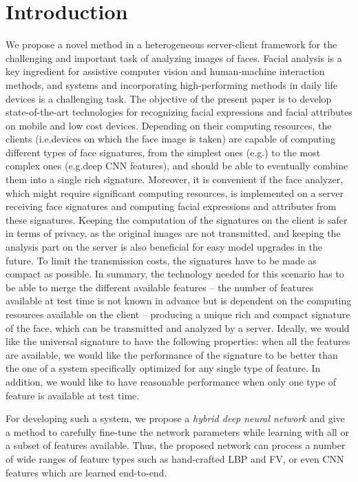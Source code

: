 \documentclass{sig-alternate-05-2015}
\begin{document}
\section{Introduction}\label{sec:intro}
We propose a novel method in a heterogeneous server-client framework for the challenging and important task of analyzing images of faces. Facial analysis is a key ingredient for assistive computer vision and human-machine interaction methods, and systems and incorporating high-performing methods in daily life devices is a challenging task. The objective of the present paper is to develop state-of-the-art technologies for recognizing facial expressions and facial attributes on mobile and low cost devices. Depending on their computing resources, the clients (i.e.\the devices on which the face image is taken) are capable of computing different types of face signatures, from the simplest ones (e.g.\LPB) to the most complex ones (e.g.\very deep CNN features), and should be able to eventually combine them into a single rich signature. Moreover, it is convenient if the face analyzer, which might require significant computing resources, is implemented on a server receiving face signatures and computing facial expressions and attributes from these signatures. Keeping the computation of the signatures on the client is safer in terms of privacy, as the original images are not transmitted, and keeping the analysis part on the server is also beneficial for easy model upgrades in the future. To limit the transmission costs, the signatures have to be made as compact as possible. In summary, the technology needed for this scenario has to be able to merge the different available features -- the number of features available at test time is not known in advance but is dependent on the computing resources available on the client -- producing a unique rich and compact signature of the face, which can be transmitted and analyzed by a server. Ideally, we would like the  universal signature to have the following properties: when all the features are available, we would like the performance of the signature to be better than the one of a system specifically optimized for any single type of feature. In addition, we would like to have reasonable performance when only one type of feature is available at test time. 

For developing such a system,  we propose a {\em hybrid deep neural network} and give a method to carefully fine-tune the network parameters while learning with all or a subset of features available. Thus, the proposed network can process a number of wide ranges of feature types such as hand-crafted LBP and FV, or even CNN features which are learned end-to-end.
\end{document}
